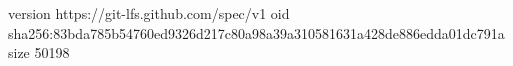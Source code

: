 version https://git-lfs.github.com/spec/v1
oid sha256:83bda785b54760ed9326d217c80a98a39a310581631a428de886edda01dc791a
size 50198
